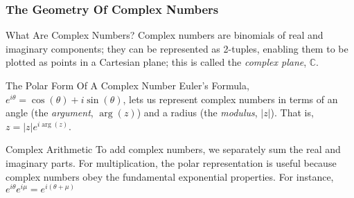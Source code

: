 \documentclass[24pt]{beamer}
\begin{document}
\begin{frame}
\frametitle{The Geometry Of Complex Numbers}

\begin{block}{What Are Complex Numbers?}
Complex numbers are binomials of real and imaginary components; they can be represented as 2-tuples, enabling them to be plotted as points in a Cartesian plane; this is called the \emph{complex plane}, $\mathbb{C}$.
\end{block}

\begin{block}{The Polar Form Of A Complex Number}
Euler's Formula, $e^{i\theta}=\cos(\theta)+i\sin(\theta)$, lets us represent complex numbers in terms of an angle (the \emph{argument}, $\arg(z)$) and a radius (the \emph{modulus}, $|z|$). That is, $z=|z|e^{i\arg(z)}$.
\end{block}

\begin{block}{Complex Arithmetic}
To add complex numbers, we separately sum the real and imaginary parts. For multiplication, the polar representation is useful because complex numbers obey the fundamental exponential properties. For instance, $e^{i\theta}e^{i\mu}=e^{i(\theta+\mu)}$
\end{block}
\end{frame}
\end{document}
